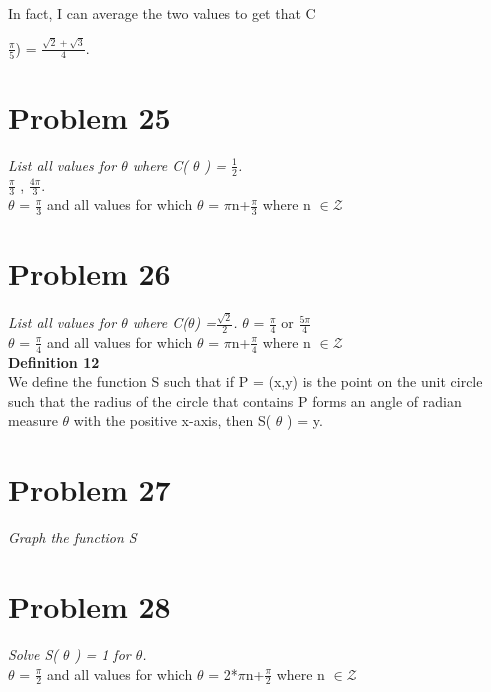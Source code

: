 \documentclass[11pt]{article} %
\newcommand\tab[1][1cm]{\hspace*{#1}}
\begin{document}
In fact, I can average the two values to get that C{$\frac{\pi}{5}$) = $\frac{\sqrt{2}+\sqrt{3}}{4}$.

\section{Problem 25}
\textit{ List all values for $\theta$ where C( $\theta$ ) = $\frac{1}{2}$.}
\\ \tab $\frac{\pi}{3}$ , $\frac{4\pi}{3}$.
\\ \tab $\theta$ = $\frac{\pi}{3}$ and all values for which $\theta$ = $\pi$n+$\frac{\pi}{3}$ where n $\in \mathcal{Z}$

\section{Problem 26}
\textit{List all values for $\theta$ where C($\theta$) =$\frac{\sqrt{2}}{2}$. }
$\theta$ =  $\frac{\pi}{4}$ or  $\frac{5\pi}{4}$
\\ \tab $\theta$ = $\frac{\pi}{4}$ and all values for which $\theta$ = $\pi$n+$\frac{\pi}{4}$ where n $\in \mathcal{Z}$
\\
\textbf{Definition 12}
\\ We define the function S such that if P = (x,y) is the point on the unit circle such that the radius of the circle that contains P forms an angle of radian measure $\theta$ with the positive x-axis, then S( $\theta$ ) = y.

\section{Problem 27}
\textit{Graph the function S}
\\

\section{Problem 28} 
\textit{Solve S( $\theta$ ) = 1 for $\theta$.}
\\ \tab $\theta$ = $\frac{\pi}{2}$ and all values for which $\theta$ = 2*$\pi$n+$\frac{\pi}{2}$ where n $\in \mathcal{Z}$

}
\end{document}
